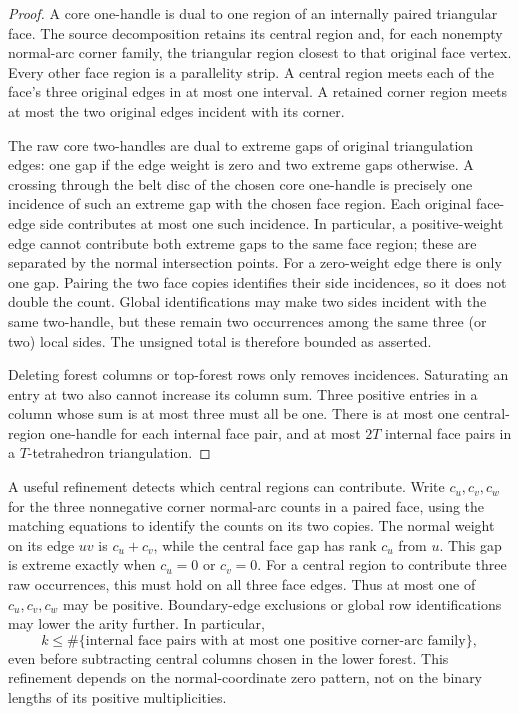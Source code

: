 \begin{proof}
A core one-handle is dual to one region of an internally paired triangular
face.  The source decomposition retains its central region and, for each
nonempty normal-arc corner family, the triangular region closest to that
original face vertex.  Every other face region is a parallelity strip.
A central region meets each of the face's three original edges in at most
one interval.  A retained corner region meets at most the two original
edges incident with its corner.

The raw core two-handles are dual to extreme gaps of original triangulation
edges: one gap if the edge weight is zero and two extreme gaps otherwise.
A crossing through the belt disc of the chosen core one-handle is precisely
one incidence of such an extreme gap with the chosen face region.  Each
original face-edge side contributes at most one such incidence.  In
particular, a positive-weight edge cannot contribute both extreme gaps to
the same face region; these are separated by the normal intersection points.
For a zero-weight edge there is only one gap.  Pairing the two face copies
identifies their side incidences, so it does not double the count.
Global identifications may make two sides incident with the same two-handle,
but these remain two occurrences among the same three (or two) local sides.
The unsigned total is therefore bounded as asserted.

Deleting forest columns or top-forest rows only removes incidences.
Saturating an entry at two also cannot increase its column sum.  Three
positive entries in a column whose sum is at most three must all be one.
There is at most one central-region one-handle for each internal face pair,
and at most $2T$ internal face pairs in a $T$-tetrahedron triangulation.
\end{proof}

A useful refinement detects which central regions can contribute.  Write
$c_u,c_v,c_w$ for the three nonnegative corner normal-arc counts in a paired
face, using the matching equations to identify the counts on its two copies.
The normal weight on its edge $uv$ is $c_u+c_v$, while the central face gap
has rank $c_u$ from $u$.  This gap is extreme exactly when $c_u=0$ or $c_v=0$.
For a central region to contribute three raw occurrences, this must hold on
all three face edges.  Thus at most one of $c_u,c_v,c_w$ may be positive.
Boundary-edge exclusions or global row identifications may lower the arity
further.  In particular,
\[
 k\le \#\{\text{internal face pairs with at most one positive corner-arc family}\},
\]
even before subtracting central columns chosen in the lower forest.  This
refinement depends on the normal-coordinate zero pattern, not on the binary
lengths of its positive multiplicities.

